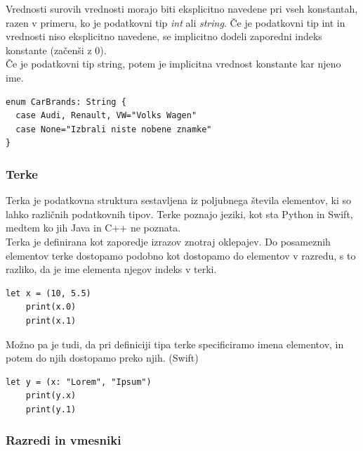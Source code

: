 \documentclass[a4paper, 12pt]{book}
\begin{document}
\indent Vrednosti surovih vrednosti morajo biti eksplicitno navedene pri vseh konstantah, razen v primeru, ko je podatkovni tip \textit{int} ali \textit{string}. Če je podatkovni tip int in vrednosti niso eksplicitno navedene, se implicitno dodeli zaporedni indeks konstante (začenši z 0).\\
\indent Če je podatkovni tip string, potem je implicitna vrednost konstante kar njeno ime.
 
\begin{lstlisting}[caption=Enumeracija s surovimi vrednostmi tipa String, captionpos=b]
enum CarBrands: String {
  case Audi, Renault, VW="Volks Wagen"
  case None="Izbrali niste nobene znamke"
}
\end{lstlisting}

 
 \subsubsection{Terke}
 
Terka je podatkovna struktura sestavljena iz poljubnega števila elementov, ki so lahko različnih podatkovnih tipov. Terke poznajo jeziki, kot sta Python in Swift, medtem ko jih Java in C++ ne poznata.\\
\indent Terka je definirana kot zaporedje izrazov znotraj oklepajev. Do posameznih elementov terke dostopamo podobno kot dostopamo do elementov v razredu, s to razliko, da je ime elementa njegov indeks v terki. 

\begin{lstlisting}[caption={Terka, sestavljena in dveh vrednosti (Int in Double)}, captionpos=b]
	let x = (10, 5.5) 
	print(x.0)
	print(x.1)
\end{lstlisting} 

Možno pa je tudi, da pri definiciji tipa terke specificiramo imena elementov, in potem do njih dostopamo preko njih. (Swift)

\begin{lstlisting}[caption={Terka, v kateri je en element poimenovan, drugi pa ne}, captionpos=b]
	let y = (x: "Lorem", "Ipsum")
	print(y.x)
	print(y.1)
\end{lstlisting}


\subsubsection{Razredi in vmesniki}
\end{document}
